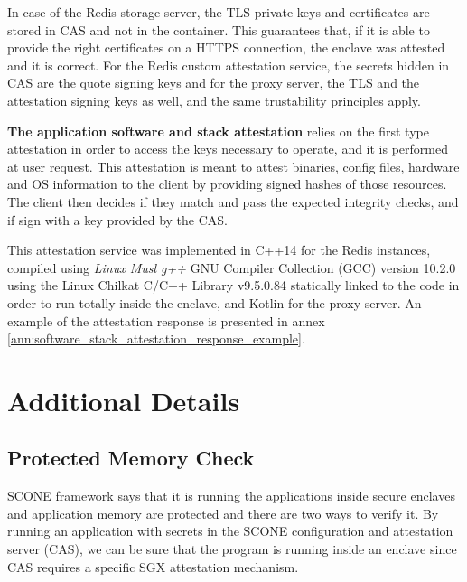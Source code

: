 In case of the Redis storage server, the \gls{TLS} private keys and certificates are stored in \gls{CAS} and not in the container. This guarantees that, if it is able to provide the right certificates on a \gls{HTTPS} connection, the enclave was attested and it is correct. For the Redis custom attestation service, the secrets hidden in \gls{CAS} are the quote signing keys and for the proxy server, the \gls{TLS} and the attestation signing keys as well, and the same trustability principles apply.

\textbf{The application software and stack attestation} relies on the first type attestation in order to access the keys necessary to operate, and it is performed at user request. This attestation is meant to attest binaries, config files, hardware and \gls{OS} information to the client by providing signed hashes of those resources. The client then decides if they match and pass the expected integrity checks, and if sign with a key provided by the \gls{CAS}.

This attestation service was implemented in C++14 for the Redis instances, compiled using \textit{Linux Musl g++} GNU Compiler Collection (GCC) version 10.2.0 using the Linux Chilkat C/C++ Library v9.5.0.84 statically linked to the code in order to run totally inside the enclave, and Kotlin for the proxy server. An example of the attestation response is presented in annex \ref{ann:software_stack_attestation_response_example}.

\section{Additional Details}
\label{sec:additional_details}

\subsection{Protected Memory Check}
\label{ssec:protected_memory_check}

SCONE framework says that it is running the applications inside secure enclaves and application memory are protected and there are two ways to verify it. By running an application with secrets in the SCONE configuration and attestation server (\gls{CAS}), we can be sure that the program is running inside an enclave since CAS requires a specific \gls{SGX} attestation mechanism. 


